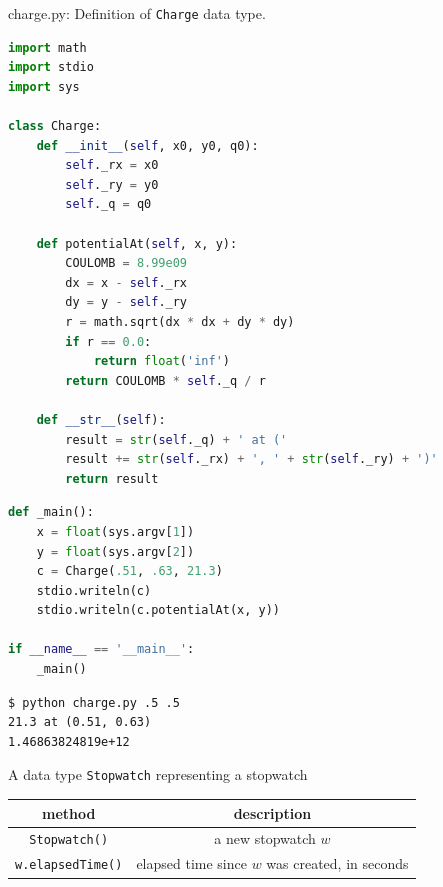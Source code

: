 \documentclass[8pt,a4paper,compress]{beamer}
\begin{document}
\begin{frame}[fragile]
\pause

\begin{framed}
\tiny charge.py: Definition of \lstinline{Charge} data type. 
\end{framed}

\begin{lstlisting}[language=Python]
import math
import stdio
import sys

class Charge:
    def __init__(self, x0, y0, q0):
        self._rx = x0
        self._ry = y0
        self._q = q0

    def potentialAt(self, x, y):
        COULOMB = 8.99e09
        dx = x - self._rx
        dy = y - self._ry
        r = math.sqrt(dx * dx + dy * dy)
        if r == 0.0:
            return float('inf')
        return COULOMB * self._q / r

    def __str__(self):
        result = str(self._q) + ' at ('
        result += str(self._rx) + ', ' + str(self._ry) + ')'
        return result
\end{lstlisting}
\end{frame}

\begin{frame}[fragile]
\pause

\begin{lstlisting}[language=Python]
def _main():
    x = float(sys.argv[1])
    y = float(sys.argv[2])
    c = Charge(.51, .63, 21.3)
    stdio.writeln(c)
    stdio.writeln(c.potentialAt(x, y))

if __name__ == '__main__':
    _main()
\end{lstlisting}

\pause

\begin{lstlisting}[language={}]
$ python charge.py .5 .5
21.3 at (0.51, 0.63)
1.46863824819e+12
\end{lstlisting}
\end{frame}

\begin{frame}[fragile]
\pause

A data type \lstinline{Stopwatch} representing a stopwatch
\begin{center}
\begin{tabular}{cc}
method & description \\ \hline
\lstinline$Stopwatch()$ & a new stopwatch $w$ \\
\lstinline$w.elapsedTime()$ & elapsed time since $w$ was created, in seconds
\end{tabular} 
\end{center}
\end{frame}
\end{document}
